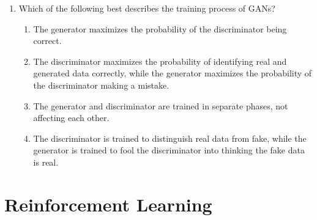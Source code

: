 \documentclass{report}
\numberwithin{equation}{section}
\begin{document}
\begin{enumerate}
\item Which of the following best describes the training process of GANs?
\begin{enumerate}[label=\alph*.]
    \item The generator maximizes the probability of the discriminator being correct.
    \item The discriminator maximizes the probability of identifying real and generated data correctly, while the generator maximizes the probability of the discriminator making a mistake.
    \item The generator and discriminator are trained in separate phases, not affecting each other.
    \item The discriminator is trained to distinguish real data from fake, while the generator is trained to fool the discriminator into thinking the fake data is real.
\end{enumerate}
\end{enumerate}

\section{Reinforcement Learning}
\end{document}
